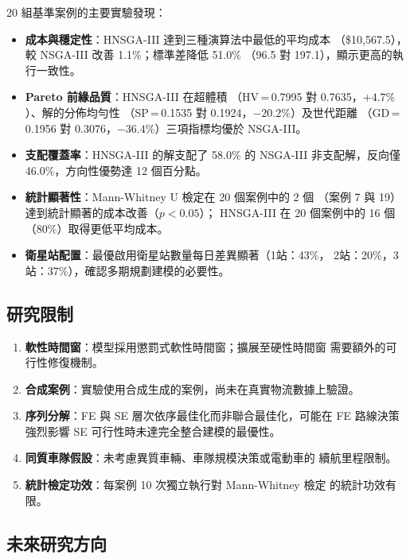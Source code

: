 \documentclass[11pt, a4paper]{article}
\numberwithin{equation}{section}
\begin{document}
20 組基準案例的主要實驗發現：
\begin{itemize}
  \item \textbf{成本與穩定性}：HNSGA-III 達到三種演算法中最低的平均成本
        （\$10{,}567.5），較 NSGA-III 改善 1.1\%；標準差降低 51.0\%
        （96.5 對 197.1），顯示更高的執行一致性。
  \item \textbf{Pareto 前緣品質}：HNSGA-III 在超體積
        （HV\,=\,0.7995 對 0.7635，$+4.7\%$）、解的分佈均勻性
        （SP\,=\,0.1535 對 0.1924，$-20.2\%$）及世代距離
        （GD\,=\,0.1956 對 0.3076，$-36.4\%$）三項指標均優於 NSGA-III。
  \item \textbf{支配覆蓋率}：HNSGA-III 的解支配了 58.0\% 的 NSGA-III
        非支配解，反向僅 46.0\%，方向性優勢達 12 個百分點。
  \item \textbf{統計顯著性}：Mann-Whitney U 檢定在 20 個案例中的 2 個
        （案例 7 與 19）達到統計顯著的成本改善（$p<0.05$）；
        HNSGA-III 在 20 個案例中的 16 個（80\%）取得更低平均成本。
  \item \textbf{衛星站配置}：最優啟用衛星站數量每日差異顯著（1站：43\%，
        2站：20\%，3站：37\%），確認多期規劃建模的必要性。
\end{itemize}

\subsection{研究限制}

\begin{enumerate}
  \item \textbf{軟性時間窗}：模型採用懲罰式軟性時間窗；擴展至硬性時間窗
        需要額外的可行性修復機制。
  \item \textbf{合成案例}：實驗使用合成生成的案例，尚未在真實物流數據上驗證。
  \item \textbf{序列分解}：FE 與 SE 層次依序最佳化而非聯合最佳化，可能在
        FE 路線決策強烈影響 SE 可行性時未達完全整合建模的最優性。
  \item \textbf{同質車隊假設}：未考慮異質車輛、車隊規模決策或電動車的
        續航里程限制。
  \item \textbf{統計檢定功效}：每案例 10 次獨立執行對 Mann-Whitney 檢定
        的統計功效有限。
\end{enumerate}

\subsection{未來研究方向}
\end{document}
